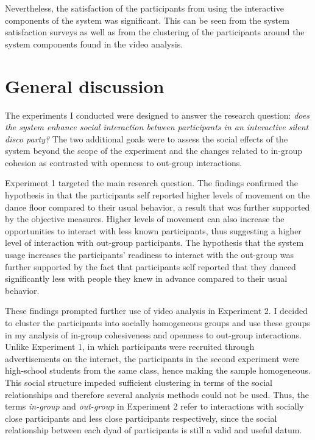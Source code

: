 \documentclass[a4paper,11pt]{article}
\newcommand{\definition}[1]{\emph{#1}}
\begin{document}
{Nevertheless, the satisfaction of the participants from using the interactive components of the system was significant.
This can be seen from the system satisfaction surveys as well as from the clustering of the participants around the system components found in the video analysis.

\section{General discussion}

The experiments I conducted were designed to answer the research question: \emph{does the system enhance social interaction between participants in an interactive silent disco party?}
The two additional goals were to assess the social effects of the system beyond the scope of the experiment and the changes related to in-group cohesion as contrasted with openness to out-group interactions.

Experiment 1 targeted the main research question.
The findings confirmed the hypothesis in that the participants self reported higher levels of movement on the dance floor compared to their usual behavior, a result that was further supported by the objective measures.
Higher levels of movement can also increase the opportunities to interact with less known participants, thus suggesting a higher level of interaction with out-group participants.
The hypothesis that the system usage increases the participants' readiness to interact with the out-group was further supported by the fact that participants self reported that they danced significantly less with people they knew in advance compared to their usual behavior.

These findings prompted further use of video analysis in Experiment 2.
I decided to cluster the participants into socially homogeneous groups and use these groups in my analysis of in-group cohesiveness and openness to out-group interactions.
Unlike Experiment 1, in which participants were recruited through advertisements on the internet, the participants in the second experiment were high-school students from the same class, hence making the sample homogeneous.
This social structure impeded sufficient clustering in terms of the social relationships and therefore several analysis methods could not be used.
Thus, the terms \definition{in-group} and \definition{out-group} in Experiment 2 refer to interactions with socially close participants and less close participants respectively, since the social relationship between each dyad of participants is still a valid and useful datum.

}
\end{document}
